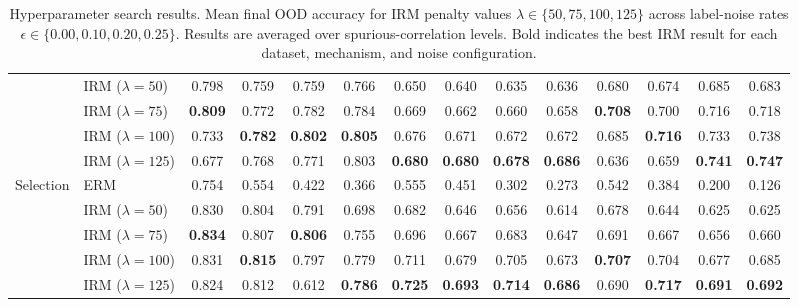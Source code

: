 \documentclass[11pt]{article}
\theoremstyle{definition}
\theoremstyle{plain}
\begin{document}
\begin{table}[t]
\begin{tabular*}{\textwidth}{
@{\extracolsep{\fill}}
ll
cccc
cccc
cccc
@{}
}
& IRM ($\lambda=50$)
& 0.798 & 0.759 & 0.759 & 0.766
& 0.650 & 0.640 & 0.635 & 0.636
& 0.680 & 0.674 & 0.685 & 0.683 \\

& IRM ($\lambda=75$)
& \textbf{0.809} & 0.772 & 0.782 & 0.784
& 0.669 & 0.662 & 0.660 & 0.658
& \textbf{0.708} & 0.700 & 0.716 & 0.718 \\

& IRM ($\lambda=100$)
& 0.733 & \textbf{0.782} & \textbf{0.802} & \textbf{0.805}
& 0.676 & 0.671 & 0.672 & 0.672
& 0.685 & \textbf{0.716} & 0.733 & 0.738 \\

& IRM ($\lambda=125$)
& 0.677 & 0.768 & 0.771 & 0.803
& \textbf{0.680} & \textbf{0.680} & \textbf{0.678} & \textbf{0.686}
& 0.636 & 0.659 & \textbf{0.741} & \textbf{0.747} \\

\midrule

\multirow{5}{*}{Selection}
& ERM
& 0.754 & 0.554 & 0.422 & 0.366
& 0.555 & 0.451 & 0.302 & 0.273
& 0.542 & 0.384 & 0.200 & 0.126 \\

& IRM ($\lambda=50$)
& 0.830 & 0.804 & 0.791 & 0.698
& 0.682 & 0.646 & 0.656 & 0.614
& 0.678 & 0.644 & 0.625 & 0.625 \\

& IRM ($\lambda=75$)
& \textbf{0.834} & 0.807 & \textbf{0.806} & 0.755
& 0.696 & 0.667 & 0.683 & 0.647
& 0.691 & 0.667 & 0.656 & 0.660 \\

& IRM ($\lambda=100$)
& 0.831 & \textbf{0.815} & 0.797 & 0.779
& 0.711 & 0.679 & 0.705 & 0.673
& \textbf{0.707} & 0.704 & 0.677 & 0.685 \\

& IRM ($\lambda=125$)
& 0.824 & 0.812 & 0.612 & \textbf{0.786}
& \textbf{0.725} & \textbf{0.693} & \textbf{0.714} & \textbf{0.686}
& 0.690 & \textbf{0.717} & \textbf{0.691} & \textbf{0.692} \\

\bottomrule
\end{tabular*}
\caption{
Hyperparameter search results. Mean final OOD accuracy for IRM penalty
values $\lambda\in\{50,75,100,125\}$ across label-noise rates
$\epsilon\in\{0.00,0.10,0.20,0.25\}$. Results are averaged over
spurious-correlation levels. Bold indicates the best IRM result for
each dataset, mechanism, and noise configuration.
}
\label{tab:hparam_search}
\end{table}
\end{document}
